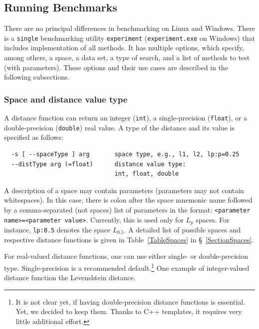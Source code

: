 \documentclass[runningheads,a4paper]{llncs}
\newcommand{\ttt}[1]{\texttt{#1}}
\begin{document}
{\subsection{Running Benchmarks}\label{SectionRunBenchmark}
There are no principal differences in benchmarking on Linux and Windows.
There is a \ttt{single} benchmarking utility 
\ttt{experiment} (\ttt{experiment.exe} on Windows) that includes implementation of all methods.
It has multiple options, which specify, among others, 
a space, a data set, a type of search, and a list of methods to test (with parameters).
These options and their use cases are described in the following subsections.

\subsubsection{Space and distance value type}

A distance function can return an integer (\ttt{int}), a single-precision (\ttt{float}),
or a double-precision (\ttt{double}) real value.
A type of the distance and its value is specified as follows:

\begin{verbatim}
  -s [ --spaceType ] arg       space type, e.g., l1, l2, lp:p=0.25
  --distType arg (=float)      distance value type: 
                               int, float, double
\end{verbatim}

A description of a space may contain parameters (parameters may not contain whitespaces).
In this case, there is colon after the space mnemonic name followed by a
comma-separated (not spaces) list of parameters in the format:
\ttt{<parameter name>=<parameter value>}.
Currently, this is used only for $L_p$ spaces. For instance,
 \ttt{lp:0.5} denotes the space $L_{0.5}$.
A detailed list of possible spaces and respective
distance functions is given in Table~\ref{TableSpaces} in \S~\ref{SectionSpaces}.

For real-valued distance functions, one can use either single- or double-precision
type. Single-precision is a recommended default.\footnote{It is not clear yet,
if having double-precision distance functions is essential. Yet, we decided
to keep them. Thanks to C++ templates, it requires very little additional effort.}
One example of integer-valued distance function the Levenshtein distance.

}
\end{document}
